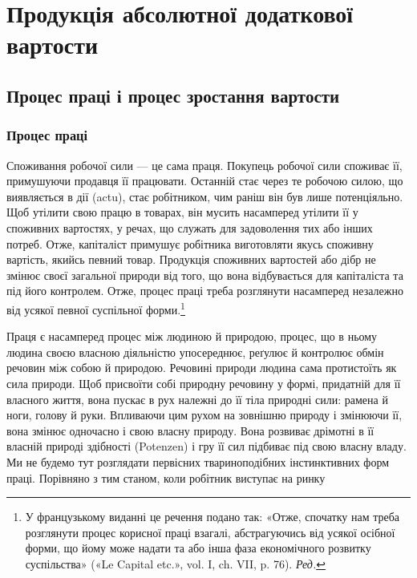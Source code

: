 \chapter{Продукція абсолютної додаткової вартости}

\section{Процес праці і процес зростання вартости\footnotemarkZ}
\subsection{Процес праці}

Споживання робочої сили — це сама праця. Покупець робочої
сили споживає її, примушуючи продавця її працювати. Останній
стає через те робочою силою, що виявляється в дії (actu),
стає робітником, чим раніш він був лише потенціяльно. Щоб
утілити свою працю в товарах, він мусить насамперед утілити
її у споживних вартостях, у речах, що служать для задоволення
тих або інших потреб. Отже, капіталіст примушує робітника
виготовляти якусь споживну вартість, якийсь певний товар.
Продукція споживних вартостей або дібр не змінює своєї загальної
природи від того, що вона відбувається для капіталіста та
під його контролем. Отже, процес праці треба розглянути насамперед
незалежно від усякої певної суспільної форми.\footnote*{
У французькому виданні це речення подано так: «Отже, спочатку
нам треба розглянути процес корисної праці взагалі, абстрагуючись
від усякої осібної форми, що йому може надати та або інша фаза економічного
розвитку суспільства» («Le Capital etc.», vol. I, ch. VII, p. 76). \emph{Ред.}
}

Праця є насамперед процес між людиною й природою, процес,
що в ньому людина своєю власною діяльністю упосереднює, реґулює
й контролює обмін речовин між собою й природою. Речовині
природи людина сама протистоїть як сила природи. Щоб
присвоїти собі природну речовину у формі, придатній для її власного
життя, вона пускає в рух належні до її тіла природні сили:
рамена й ноги, голову й руки. Впливаючи цим рухом на зовнішню
природу і змінюючи її, вона змінює одночасно і свою власну природу.
Вона розвиває дрімотні в її власній природі здібності (Potenzen)
і гру її сил підбиває під свою власну владу. Ми не будемо
тут розглядати первісних твариноподібних інстинктивних форм
праці. Порівняно з тим станом, коли робітник виступає на ринку
\parbreak{}  %
